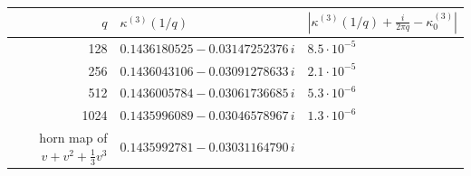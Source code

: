 \begin{tabular}{@{}rll@{}}
\toprule
$q$ & $\kappa^{(3)}(1/q)$ & $|\kappa^{(3)}(1/q)+\tfrac{i}{2\pi q}-\kappa_0^{(3)}|$ \\
\midrule
128 & $0.1436180525 - 0.03147252376\,i$ & $8.5\cdot10^{-5}$ \\
256 & $0.1436043106 - 0.03091278633\,i$ & $2.1\cdot10^{-5}$ \\
512 & $0.1436005784 - 0.03061736685\,i$ & $5.3\cdot10^{-6}$ \\
1024 & $0.1435996089 - 0.03046578967\,i$ & $1.3\cdot10^{-6}$ \\
\midrule
horn map of $v+v^2+\tfrac13v^3$ & $0.1435992781 - 0.03031164790\,i$ & \\
\bottomrule
\end{tabular}
